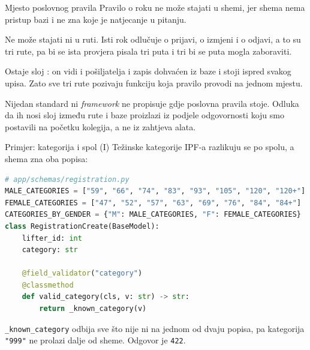 \begin{frame}{Mjesto poslovnog pravila}
Pravilo o roku ne može stajati u shemi, jer shema nema pristup bazi i ne zna koje je natjecanje u pitanju.

\vspace{0.5em}
Ne može stajati ni u ruti. Isti rok odlučuje o prijavi, o izmjeni i o odjavi, a to su tri rute, pa bi se ista provjera pisala tri puta i tri bi se puta mogla zaboraviti.

\vspace{0.5em}
Ostaje sloj : on vidi i pošiljatelja i zapis dohvaćen iz baze i stoji ispred svakog upisa. Zato sve tri rute pozivaju funkciju koja pravilo provodi na jednom mjestu.

\vspace{0.6em}
\begin{konvencija}
Nijedan standard ni \emph{framework} ne propisuje gdje poslovna pravila stoje. Odluka da ih nosi sloj između rute i baze proizlazi iz podjele odgovornosti koju smo postavili na početku kolegija, a ne iz zahtjeva alata.
\end{konvencija}
\end{frame}

\begin{frame}[fragile]{Primjer: kategorija i spol (I)}
Težinske kategorije IPF-a razlikuju se po spolu, a shema zna oba popisa:

\begin{lstlisting}[language=python]
# app/schemas/registration.py
MALE_CATEGORIES = ["59", "66", "74", "83", "93", "105", "120", "120+"]
FEMALE_CATEGORIES = ["47", "52", "57", "63", "69", "76", "84", "84+"]
CATEGORIES_BY_GENDER = {"M": MALE_CATEGORIES, "F": FEMALE_CATEGORIES}
class RegistrationCreate(BaseModel):
    lifter_id: int
    category: str

    @field_validator("category")
    @classmethod
    def valid_category(cls, v: str) -> str:
        return _known_category(v)
\end{lstlisting}

\vspace{0.3em}
\texttt{\_known\_category} odbija sve što nije ni na jednom od dvaju popisa, pa kategorija \texttt{"999"} ne prolazi dalje od sheme. Odgovor je \texttt{422}.
\end{frame}

